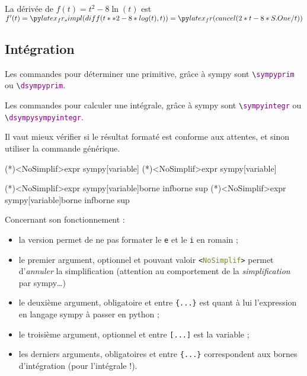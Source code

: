 \documentclass[french,a4paper,11pt]{article}
\newcommand\Cle[1]{{\bfseries\sffamily\textlangle #1\textrangle}}
\begin{document}
\begin{bloctext}
La dérivée de $f(t)=t^2-8\ln(t)$ est 
$f'(t)= \dsympyderiv{t**2-8*log(t)}[t] = \dsympycalc<NoSimplif>{cancel(2*t-8/t)}$
\end{bloctext}

\subsection{Intégration}

\begin{cautionblock}
Les commandes pour déterminer une primitive, grâce à \textsf{sympy} sont \texttt{\textbackslash \textcolor{purple}{sympyprim}} ou \texttt{\textbackslash \textcolor{purple}{dsympyprim}}.

\smallskip

Les commandes pour calculer une intégrale, grâce à \textsf{sympy} sont \texttt{\textbackslash \textcolor{purple}{sympyintegr}} ou \texttt{\textbackslash \textcolor{purple}{dsympysympyintegr}}.

\smallskip

Il vaut mieux vérifier si le résultat formaté est conforme aux attentes, et sinon utiliser la commande générique.
\end{cautionblock}

\begin{bloctext}
\sympyprim(*)<NoSimplif>{expr sympy}[variable]
\dsympyprim(*)<NoSimplif>{expr sympy}[variable]

\sympyintegr(*)<NoSimplif>{expr sympy}[variable]{borne inf}{borne sup}
\dsympyintegr(*)<NoSimplif>{expr sympy}[variable]{borne inf}{borne sup}
\end{bloctext}

\begin{tipblock}
Concernant son fonctionnement :

\begin{itemize}
	\item la version \Cle{*} permet de ne pas formater le \texttt{e} et le \texttt{i} en \textsf{romain} ;
	\item le premier argument, optionnel et pouvant valoir \texttt{<\textcolor{OliveDrab}{NoSimplif}>} permet d'\textit{annuler} la simplification (attention au comportement de la \textit{simplification} par \textsf{sympy}\ldots)
	\item le deuxième argument, obligatoire et entre \texttt{\{...\}} est quant à lui l'expression en langage \textsf{sympy} à passer en \textsf{python} ;
	\item le troisième argument, optionnel et entre \texttt{[...]} est la variable ;
	\item les derniers arguments, obligatoires et entre \texttt{\{...\}} correspondent aux bornes d'intégration (pour l'intégrale !).
\end{itemize}
\vspace*{-\baselineskip}\leavevmode
\end{tipblock}
\end{document}
